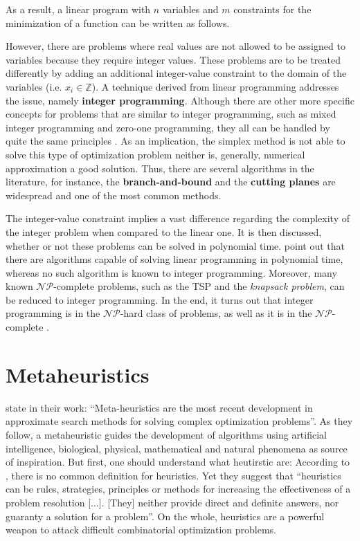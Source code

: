 \documentclass[tuberlin,cic,tc,openright,english,noabntcite,oneside]{iiufrgs}
\begin{document}
As a result, a linear program with $n$ variables and $m$ constraints for the minimization of a function can be written as follows.

However, there are problems where real values are not allowed to be assigned to variables because they require integer values. These problems are to be treated differently by adding an additional integer-value constraint to the domain of the variables (i.e. $x_{i} \in \mathbb{Z}$). A technique derived from linear programming addresses the issue, namely \textbf{integer programming}. Although there are other more specific concepts for problems that are similar to integer programming, such as mixed integer programming and zero-one programming, they all can be handled by quite the same principles \parencite[p. 175]{shenoy_linear_2007}. As an implication, the simplex method is not able to solve this type of optimization problem neither is, generally, numerical approximation a good solution. Thus, there are several algorithms in the literature, for instance, the \textbf{branch-and-bound} and the \textbf{cutting planes} are widespread and one of the most common methods.

The integer-value constraint implies a vast difference regarding the complexity of the integer problem when compared to the linear one. It is then discussed, whether or not these problems can be solved in polynomial time. \textcite{wolsey_integer_2014} point out that there are algorithms capable of solving linear programming in polynomial time, whereas no such algorithm is known to integer programming. Moreover, many known $\mathcal{NP}$-complete problems, such as the TSP and the \emph{knapsack problem}, can be reduced to integer programming. In the end, it turns out that integer programming is in the $\mathcal{NP}$-hard class of problems, as well as it is in the $\mathcal{NP}$-complete \parencite[p. 21]{schrijver_theory_1998}.

\section{Metaheuristics}

\textcite[p. 1]{osman_meta-heuristics:_2012} state in their work: \enquote{Meta-heuristics are the most recent development in approximate search methods for solving complex optimization problems}. As they follow, a metaheuristic guides the development of algorithms using artificial intelligence, biological, physical, mathematical and natural phenomena as source of inspiration. But first, one should understand what heutirstic are: According to \textcite[p. 13]{carvalho_121_2004}, there is no common definition for heuristics. Yet they suggest that \enquote{heuristics can be rules, strategies, principles or methods for increasing the effectiveness of a problem resolution [...]. [They] neither provide direct and definite answers, nor guaranty a solution for a problem}. On the whole, heuristics are a powerful weapon to attack difficult combinatorial optimization problems.
\end{document}
